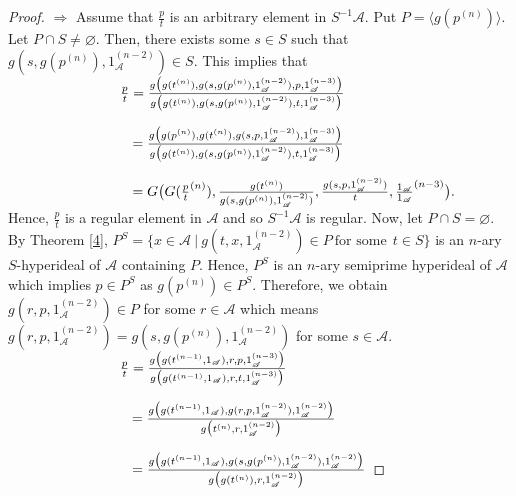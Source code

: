 \documentclass[preprint,review,10pt]{amsart}
\theoremstyle{definition}
\theoremstyle{remark}
\numberwithin{equation}{section}
\begin{document}
\begin{proof}
$\Longrightarrow$ Assume that $\frac{p}{t}$ is an arbitrary element in $S^{-1}\mathscr{A}$. Put $P=\langle g(p^{(n)}) \rangle$. Let $P \cap S \neq \varnothing$. Then, there exists some $s \in S$ such that $g(s, g(p^{(n)}),1_\mathscr{A}^{(n-2)}) \in S$. This implies that\\ 

$\hspace{2.8cm}\frac{p}{t}=\frac{g \big(g(t^{(n)}),g(s, g(p^{(n)}),1_\mathscr{A}^{(n-2)}),p, 1_\mathscr{A}^{(n-3)}\big)}{g \big(g(t^{(n)}),g(s, g(p^{(n)}),1_\mathscr{A}^{(n-2)}),t ,1_\mathscr{A}^{(n-3)}\big)}$

$\hspace{3.1cm}=\frac{g \big(g(p^{(n)}), g(t^{(n)}),g(s,p,1_\mathscr{A}^{(n-2)}), 1_\mathscr{A}^{(n-3)}\big)}{g \big(g(t^{(n)}),g(s, g(p^{(n)}),1_\mathscr{A}^{(n-2)}),t ,1_\mathscr{A}^{(n-3)}\big)}$

$\hspace{3.1cm}=G \big( G(\frac{p}{t}^{(n)}),\frac{g(t^{(n)})}{g(s,g(p^{(n)}),1_\mathscr{A}^{(n-2)})},\frac{g(s, p,1_\mathscr{A}^{(n-2)})}{t},\frac{1_\mathscr{A}}{1_\mathscr{A}}^{(n-3)}\big).$\\


Hence, $\frac{p}{t}$ is a regular element in $\mathscr{A}$ and so $S^{-1}\mathscr{A}$ is regular. Now, let $P \cap S=\varnothing$. By Theorem \ref{4}, $P^S=\{x \in \mathscr{A} \ \vert \ g(t,x,1_\mathscr{A}^{(n-2)}) \in P\ \text{for some}  \ \ t \in S\}$ is an $n$-ary $S$-hyperideal of $\mathscr{A}$ containing $P$. Hence, $P^S$ is an $n$-ary semiprime hyperideal of $\mathscr{A}$ which implies $p \in P^S$ as $g(p^{(n)}) \in P^S$. Therefore, we obtain $g(r,p,1_\mathscr{A}^{(n-2)}) \in P$ for some $r \in \mathscr{A}$ which means $g(r,p,1_\mathscr{A}^{(n-2)})=g(s,g(p^{(n)}),1_\mathscr{A}^{(n-2)})$ for some $s \in \mathscr{A}$.\\

$\hspace{2.8cm}\frac{p}{t}=\frac{g \big(g(t^{(n-1)},1_\mathscr{A}),r,p,1_\mathscr{A}^{(n-3)}\big)}{g \big(g(t^{(n-1)},1_\mathscr{A}),r,t,1_\mathscr{A}^{(n-3)} \big)}$

$\hspace{3.1cm}=\frac{g \big(g(t^{(n-1)},1_\mathscr{A}),g(r,p,1_\mathscr{A}^{(n-2)}),1_\mathscr{A}^{(n-2)}\big)}{g \big(t^{(n)},r,1_ \mathscr{A}^{(n-2)}\big)}$


$\hspace{03.1cm}=\frac{g \big(g(t^{(n-1)},1_\mathscr{A}),g(s,g(p^{(n)}),1_\mathscr{A}^{(n-2)}),1_\mathscr{A}^{(n-2)}\big)}{g \big(g(t^{(n)}),r, 1_\mathscr{A}^{(n-2)}\big)}$



\end{proof}
\end{document}
